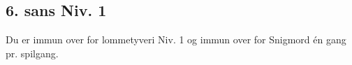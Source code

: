 \subsection{6. sans Niv. 1}
Du er immun over for lommetyveri Niv. 1 og immun over for Snigmord én gang pr. spilgang.\\
